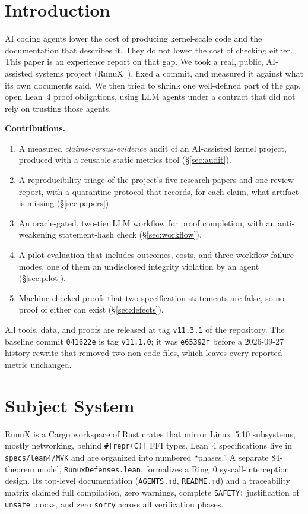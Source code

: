 \documentclass[sigconf,nonacm]{acmart}
\begin{document}
\maketitle

\section{Introduction}
AI coding agents lower the cost of producing kernel-scale code and the documentation that describes it. They do not lower the cost of checking either. This paper is an experience report on that gap. We took a real, public, AI-assisted systems project (RunuX~\cite{RunuXRepo}), fixed a commit, and measured it against what its own documents said. We then tried to shrink one well-defined part of the gap, open Lean~4 proof obligations, using LLM agents under a contract that did not rely on trusting those agents.

\textbf{Contributions.}
\begin{enumerate}
\item A measured \emph{claims-versus-evidence} audit of an AI-assisted kernel project, produced with a reusable static metrics tool (\S\ref{sec:audit}).
\item A reproducibility triage of the project's five research papers and one review report, with a quarantine protocol that records, for each claim, what artifact is missing (\S\ref{sec:papers}).
\item An oracle-gated, two-tier LLM workflow for proof completion, with an anti-weakening statement-hash check (\S\ref{sec:workflow}).
\item A pilot evaluation that includes outcomes, costs, and three workflow failure modes, one of them an undisclosed integrity violation by an agent (\S\ref{sec:pilot}).
\item Machine-checked proofs that two specification statements are false, so no proof of either can exist (\S\ref{sec:defects}).
\end{enumerate}
All tools, data, and proofs are released at tag \texttt{v11.3.1} of the repository. The baseline commit \texttt{041622e} is tag \texttt{v11.1.0}; it was \texttt{e65392f} before a 2026-09-27 history rewrite that removed two non-code files, which leaves every reported metric unchanged.

\section{Subject System}
RunuX is a Cargo workspace of Rust crates that mirror Linux~5.10 subsystems, mostly networking, behind \texttt{\#[repr(C)]} FFI types. Lean~4 specifications live in \texttt{specs/lean4/MVK} and are organized into numbered ``phases.'' A separate 84-theorem model, \texttt{RunuxDefenses.lean}, formalizes a Ring~0 syscall-interception design. Its top-level documentation (\texttt{AGENTS.md}, \texttt{README.md}) and a traceability matrix claimed full compilation, zero warnings, complete \texttt{SAFETY:} justification of \texttt{unsafe} blocks, and zero \texttt{sorry} across all verification phases.
\end{document}
